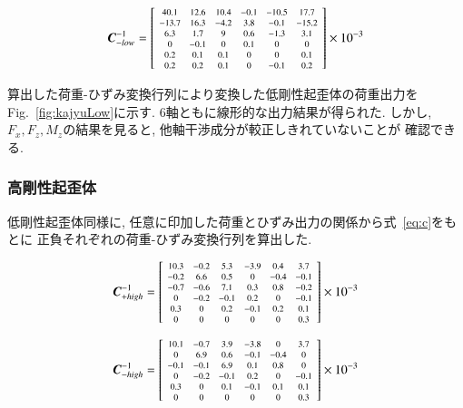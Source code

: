  \begin{eqnarray}
   \bm{C}^{-1}_{-low} = \left[
     \scalebox{0.7}{$\displaystyle
  \begin{array}{cccccc}
   40.1  &12.6 &10.4 &-0.1 &-10.5  &17.7    \\
   -13.7 &16.3 &-4.2 &3.8  &-0.1   &-15.2   \\
   6.3   &1.7  &9    &0.6  &-1.3   &3.1     \\
   0     &-0.1 &0    &0.1  &0      &0       \\
   0.2   &0.1  &0.1  &0    &0      &0.1     \\
   0.2   &0.2  &0.1  &0    &-0.1   &0.2  
 \end{array}$}
 \right]
 \times 10^{-3} 
 \end{eqnarray}

算出した荷重-ひずみ変換行列により変換した低剛性起歪体の荷重出力を
Fig.~\ref{fig:kajyuLow}に示す.
6軸ともに線形的な出力結果が得られた. 
しかし, $F_x, F_z, M_z$の結果を見ると, 他軸干渉成分が較正しきれていないことが
確認できる. 

\subsubsection*{高剛性起歪体}
低剛性起歪体同様に, 任意に印加した荷重とひずみ出力の関係から式~\eqref{eq:c}をもとに
正負それぞれの荷重-ひずみ変換行列を算出した. 

\begin{eqnarray}
  \bm{C}^{-1}_{+high} = \left[
    \scalebox{0.7}{$\displaystyle
 \begin{array}{cccccc}
10.3  &-0.2   &5.3  &-3.9  &0.4  &3.7   \\
-0.2  &6.6    &0.5  &0     &-0.4 &-0.1  \\
-0.7  &-0.6   &7.1  &0.3   &0.8  &-0.2  \\
0     &-0.2   &-0.1 &0.2   &0    &-0.1  \\
0.3   &0      &0.2  &-0.1  &0.2  &0.1   \\
0     &0      &0    &0     &0    &0.3  
\end{array}$}
\right]
\times 10^{-3}
\end{eqnarray}

\begin{eqnarray}
  \bm{C}^{-1}_{-high} = \left[
    \scalebox{0.7}{$\displaystyle
 \begin{array}{cccccc}
  10.1  &-0.7 &3.9  &-3.8 &0    &3.7   \\
  0     &6.9  &0.6  &-0.1 &-0.4 &0     \\
  -0.1  &-0.1 &6.9  &0.1  &0.8  &0     \\
  0     &-0.2 &-0.1 &0.2  &0    &-0.1  \\
  0.3   &0    &0.1  &-0.1 &0.1  &0.1   \\
  0     &0    &0    &0    &0    &0.3  
\end{array}$}
\right]
\times 10^{-3}
\end{eqnarray}

